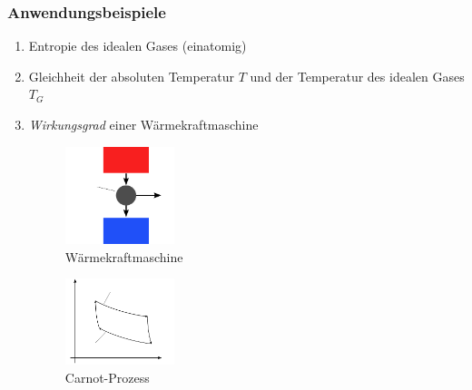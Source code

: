 \subsubsection{Anwendungsbeispiele}
\begin{enumerate}
  \item Entropie des idealen Gases (einatomig)
  \item Gleichheit der absoluten Temperatur $T$ und der Temperatur des idealen Gases $T_G$
  \item \emph{Wirkungsgrad} einer Wärmekraftmaschine
  \begin{figure}[H]
\begin{center}
  \includegraphics[width=0.3\textwidth]{../img/waermekraftmaschine.pdf}
  \caption{Wärmekraftmaschine}
  \label{img:waermekraftmaschine}
\end{center}
\end{figure}

\begin{figure}[H]
\begin{center}
  \includegraphics[width=0.3\textwidth]{../img/carnotprocess.pdf}
  \caption{Carnot-Prozess}
  \label{img:carnot}
\end{center}
\end{figure}


\end{enumerate}
